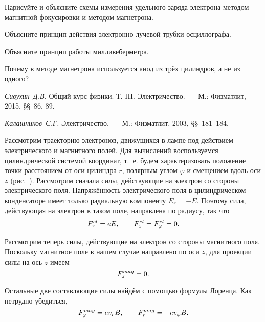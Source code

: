 \begin{lab:questions}
\item{ Нарисуйте и объясните схемы измерения удельного заряда электрона методом магнитной фокусировки и методом магнетрона.}
\item{Объясните принцип действия электронно-лучевой трубки осциллографа.}
\item{ Объясните принцип работы милливеберметра.}
\item{ Почему в методе магнетрона используется анод из трёх цилиндров, а не из одного?}
\end{lab:questions}

\begin{lab:literature}
\item{ \emph {Сивухин~Д.В.} Общий курс физики. Т. III. Электричество.~--- М.: Физматлит, 2015, \S\S~86, 89.}
\item{ \emph {Калашников~С.Г.} Электричество.~--- М.: Физматлит, 2003, \S\S~181--184.}
\end{lab:literature}





Рассмотрим траекторию электронов, движущихся в лампе под действием электрического и магнитного полей. Для вычислений воспользуемся цилиндрической системой координат, т.~е. будем характеризовать положение точки расстоянием от оси цилиндра $r$, полярным углом $\varphi$ и смещением вдоль оси $z$ (рис.~). Рассмотрим сначала силы, действующие на электрон со стороны электрического поля. Напряжённость электрического поля в цилиндрическом конденсаторе имеет только радиальную компоненту $E_r=-E$. Поэтому сила, действующая на электрон в таком поле, направлена по радиусу, так что
\begin{equation}
	F_r^{el}=eE,\qquad F_z^{el}=F_{\varphi}^{el}=0.
	\eqmark{3.1.4}
\end{equation}

Рассмотрим теперь силы, действующие на электрон со стороны магнитного поля. Поскольку магнитное поле в нашем случае
направлено по оси $z$, для проекции силы на ось $z$ имеем
\begin{equation}
	F_z^{mag}=0.
	\eqmark{3.1.5}
\end{equation}

Остальные две составляющие силы найдём с помощью формулы Лоренца. Как нетрудно убедиться,
\begin{equation}
	F_{\varphi}^{mag}=ev_rB,\qquad F_{r}^{mag}=-ev_{\varphi}B.
	\eqmark{3.1.6}
\end{equation}


